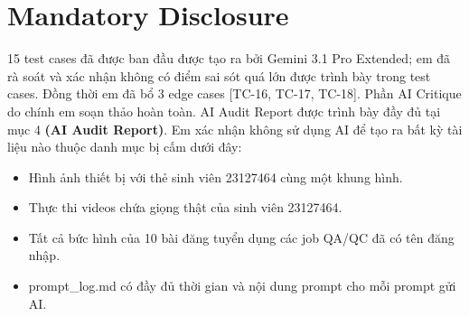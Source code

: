 \section{Mandatory Disclosure}

15 test cases đã được ban đầu được tạo ra bởi Gemini 3.1 Pro Extended; em đã rà soát và xác nhận không có điểm sai sót quá lớn được trình bày trong test cases. Đồng thời em đã bổ 3 edge cases [TC-16, TC-17, TC-18]. Phần AI Critique do chính em soạn thảo hoàn toàn. AI Audit Report được trình bày đầy đủ tại mục 4 \textbf{(AI Audit Report)}. Em xác nhận không sử dụng AI để tạo ra bất kỳ tài liệu nào thuộc danh mục bị cấm dưới đây:
\begin{itemize}
    \item Hình ảnh thiết bị với thẻ sinh viên 23127464 cùng một khung hình.
    \item Thực thi videos chứa giọng thật của sinh viên 23127464.
    \item Tất cả bức hình của 10 bài đăng tuyển dụng các job QA/QC đã có tên đăng nhập.
    \item prompt\_log.md có đầy đủ thời gian và nội dung prompt cho mỗi prompt gửi AI.
\end{itemize}